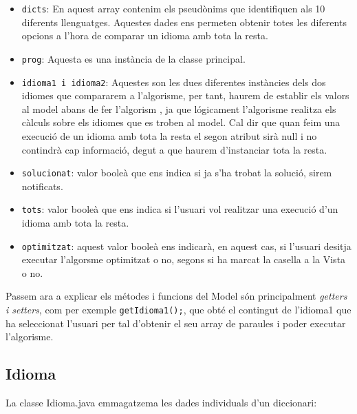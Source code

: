 \documentclass[conference]{IEEEtran}
\begin{document}
    \begin{itemize}
        \item \texttt{dicts}: En aquest array contenim els pseudònims que identifiquen als 10 diferents llenguatges. Aquestes dades ens permeten obtenir totes les diferents opcions a l'hora de comparar un idioma amb tota la resta.\\
        \item \texttt{prog}: Aquesta es una instància de la classe principal.\\
        \item \texttt{idioma1 i idioma2}: Aquestes son les dues diferentes instàncies dels dos idiomes que compararem a l'algorisme, per tant, haurem de establir els valors al model abans de fer l'algorism , ja que lógicament l'algorisme realitza els càlculs sobre els idiomes que es troben al model. Cal dir que quan feim una execució de un idioma amb tota la resta el segon atribut sirà null i no contindrà cap informació, degut a que haurem d'instanciar tota la resta.\\
        \item \texttt{solucionat}: valor booleà que ens indica si ja s'ha trobat la solució, sirem notificats.\\
        \item \texttt{tots}: valor booleà que ens indica si l'usuari vol realitzar una execució d'un idioma amb tota la resta.\\
        \item \texttt{optimitzat}: aquest valor booleà ens indicarà, en aquest cas, si l'usuari desitja executar l'algorsme optimitzat o no, segons si ha marcat la casella a la Vista o no.\\

    \end{itemize}
    Passem ara a explicar els métodes i funcions del Model són principalment \textit{getters i setters}, com per exemple \texttt{getIdioma1();}, que obté el contingut de l'idioma1 que ha seleccionat l'usuari per tal d'obtenir el seu array de paraules i poder executar l'algorisme.
\subsection{Idioma}
La classe Idioma.java emmagatzema les dades individuals d'un diccionari:
\end{document}
